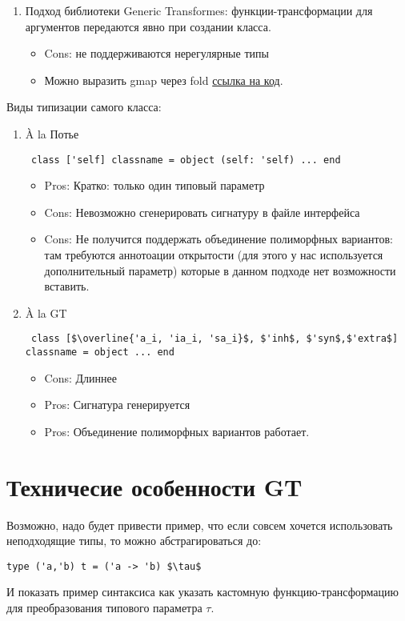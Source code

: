 \documentclass[acmsmall,review,anonymous]{acmart}\settopmatter{printfolios=true,printccs=false,printacmref=false}
\begin{document}
\begin{enumerate}
  \item Подход библиотеки Generic Transformes: функции-трансформации для аргументов передаются явно при создании класса.
    \begin{itemize}
    \item Cons: не поддерживаются нерегулярные типы
    \item Можно выразить gmap через fold \href{https://github.com/Kakadu/gt-demo/blob/master/src/demo06.ml}{ссылка на код}.
    \end{itemize}    
\end{enumerate}

Виды типизации самого класса:
\begin{enumerate}
 \item À la Потье
 \begin{lstlisting}
 class ['self] classname = object (self: 'self) ... end
 \end{lstlisting}
    \begin{itemize}
    \item Pros: Кратко: только один типовый параметр
    \item Cons: Невозможно сгенерировать сигнатуру в файле интерфейса
    \item Cons: Не получится поддержать объединение полиморфных вариантов: там требуются аннотоации открытости (для этого у нас используется дополнительный параметр) которые в данном подходе нет возможности вставить.
    \end{itemize}
 

 \item À la GT
 \begin{lstlisting}
 class [$\overline{'a_i, 'ia_i, 'sa_i}$, $'inh$, $'syn$,$'extra$] classname = object ... end
 \end{lstlisting}
 \begin{itemize}
    \item Cons: Длиннее
    \item Pros: Сигнатура генерируется 
    \item Pros: Объединение полиморфных вариантов работает.
    \end{itemize}
 
\end{enumerate}

\section{Техничесие особенности GT}
Возможно, надо будет привести пример, что если совсем хочется использовать неподходящие типы, то можно абстрагироваться до:
\begin{lstlisting}
type ('a,'b) t = ('a -> 'b) $\tau$
\end{lstlisting}
И показать пример синтаксиса как указать кастомную функцию-трансформацию для преобразования типового параметра $\tau$.
 
\end{document}
